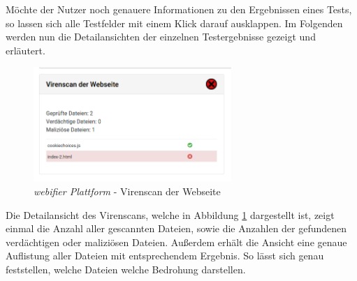 Möchte der Nutzer noch genauere Informationen zu den Ergebnissen eines Tests, so lassen sich alle Testfelder mit einem Klick darauf ausklappen. Im Folgenden werden nun die Detailansichten der einzelnen Testergebnisse gezeigt und erläutert.

\begin{figure}[H]
  \centering
  \includegraphics[width=7.5cm]{images/platform/virusscan-malicious}
  \caption{\textit{webifier Plattform} - Virenscan der Webseite}
  \label{fig:platform-result-virusscan}
\end{figure}

Die Detailansicht des Virenscans, welche in Abbildung \ref{fig:platform-result-virusscan} dargestellt ist, zeigt einmal die Anzahl aller gescannten Dateien, sowie die Anzahlen der gefundenen verdächtigen oder maliziösen Dateien. Außerdem erhält die Ansicht eine genaue Auflistung aller Dateien mit entsprechendem Ergebnis. So lässt sich genau feststellen, welche Dateien welche Bedrohung darstellen.

